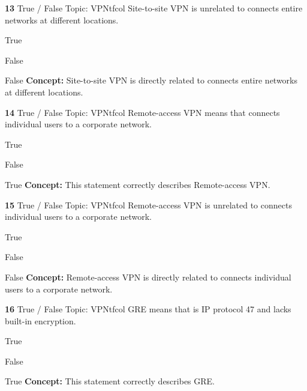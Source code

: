 \documentclass[10pt,a4paper]{article}
\begin{document}
\begin{qcard}{\color{white}\textbf{13} \hfill \small True / False \textbar{} Topic: VPN}{tfcol}
Site-to-site VPN is unrelated to connects entire networks at different locations.

\begin{qoptions}
\item True
\item False
\end{qoptions}
\begin{explainbox}{False}
\textbf{Concept:} Site-to-site VPN is directly related to connects entire networks at different locations.
\end{explainbox}
\end{qcard}

\begin{qcard}{\color{white}\textbf{14} \hfill \small True / False \textbar{} Topic: VPN}{tfcol}
Remote-access VPN means that connects individual users to a corporate network.

\begin{qoptions}
\item True
\item False
\end{qoptions}
\begin{explainbox}{True}
\textbf{Concept:} This statement correctly describes Remote-access VPN.
\end{explainbox}
\end{qcard}

\begin{qcard}{\color{white}\textbf{15} \hfill \small True / False \textbar{} Topic: VPN}{tfcol}
Remote-access VPN is unrelated to connects individual users to a corporate network.

\begin{qoptions}
\item True
\item False
\end{qoptions}
\begin{explainbox}{False}
\textbf{Concept:} Remote-access VPN is directly related to connects individual users to a corporate network.
\end{explainbox}
\end{qcard}

\begin{qcard}{\color{white}\textbf{16} \hfill \small True / False \textbar{} Topic: VPN}{tfcol}
GRE means that is IP protocol 47 and lacks built-in encryption.

\begin{qoptions}
\item True
\item False
\end{qoptions}
\begin{explainbox}{True}
\textbf{Concept:} This statement correctly describes GRE.
\end{explainbox}
\end{qcard}
\end{document}
